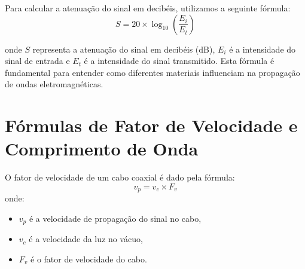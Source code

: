 \documentclass{article}
\begin{document}
\begin{itemize}
Para calcular a atenuação do sinal em decibéis, utilizamos a seguinte fórmula:
\[
S = 20 \times \log_{10}\left(\frac{E_i}{E_t}\right)
\]

onde $S$ representa a atenuação do sinal em decibéis (dB), $E_i$ é a intensidade do sinal de entrada e $E_t$ é a intensidade do sinal transmitido. Esta fórmula é fundamental para entender como diferentes materiais influenciam na propagação de ondas eletromagnéticas.

\section*{Fórmulas de Fator de Velocidade e Comprimento de Onda}

O fator de velocidade de um cabo coaxial é dado pela fórmula:
\[
v_p = v_c \times F_v
\]
onde:
\begin{itemize}
    \item \( v_p \) é a velocidade de propagação do sinal no cabo,
    \item \( v_c \) é a velocidade da luz no vácuo,
    \item \( F_v \) é o fator de velocidade do cabo.
\end{itemize}

\end{itemize}
\end{document}

